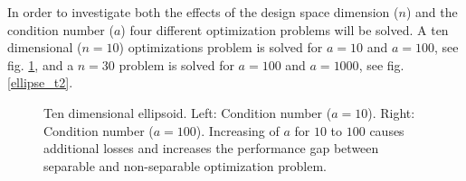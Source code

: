 In order to investigate both the effects of the design space dimension ($n$) and the condition number ($a$) four different optimization problems will be solved. A ten dimensional ($n=10$) optimizations problem is solved for $a=10$ and $a=100$, see fig. \ref{ellipse_t1}, and a $n=30$ problem is solved for $a=100$ and $a=1000$, see fig. \ref{ellipse_t2}. 


\begin{figure}[h!]
\begin{minipage}[b]{0.5\linewidth}
 \centering
\end{minipage}
\begin{minipage}[b]{0.5\linewidth}
 \centering
\end{minipage}
\caption{Ten dimensional ellipsoid. Left: Condition number ($a=10$).  Right: Condition number ($a=100$). Increasing of $a$ for $10$ to $100$ causes additional losses and increases the performance gap between separable and non-separable optimization problem.} 
\label{ellipse_t1}
\end{figure}

